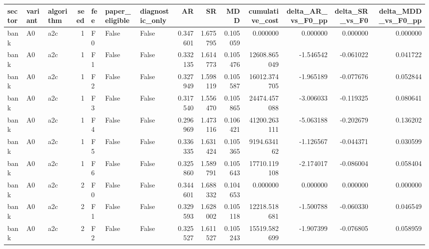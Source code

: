 \begin{tabular}{lllrlllrrrrrrr}
\toprule
    sector & variant & algorithm &  seed & fee &  paper\_eligible &  diagnostic\_only &        AR &        SR &      MDD &  cumulative\_cost &  delta\_AR\_vs\_F0\_pp &  delta\_SR\_vs\_F0 &  delta\_MDD\_vs\_F0\_pp \\
\midrule
      bank &      A0 &       a2c &     1 &  F0 &           False &            False &  0.347601 &  1.675795 & 0.105059 &         0.000000 &           0.000000 &        0.000000 &            0.000000 \\
      bank &      A0 &       a2c &     1 &  F1 &           False &            False &  0.332135 &  1.614773 & 0.105476 &     12608.865049 &          -1.546542 &       -0.061022 &            0.041722 \\
      bank &      A0 &       a2c &     1 &  F2 &           False &            False &  0.327949 &  1.598119 & 0.105587 &     16012.374705 &          -1.965189 &       -0.077676 &            0.052844 \\
      bank &      A0 &       a2c &     1 &  F3 &           False &            False &  0.317540 &  1.556470 & 0.105865 &     24474.457088 &          -3.006033 &       -0.119325 &            0.080641 \\
      bank &      A0 &       a2c &     1 &  F4 &           False &            False &  0.296969 &  1.473116 & 0.106421 &     41200.263111 &          -5.063188 &       -0.202679 &            0.136202 \\
      bank &      A0 &       a2c &     1 &  F5 &           False &            False &  0.336335 &  1.631424 & 0.105365 &      9194.634162 &          -1.126567 &       -0.044371 &            0.030599 \\
      bank &      A0 &       a2c &     1 &  F6 &           False &            False &  0.325860 &  1.589791 & 0.105643 &     17710.119108 &          -2.174017 &       -0.086004 &            0.058404 \\
      bank &      A0 &       a2c &     2 &  F0 &           False &            False &  0.344601 &  1.688332 & 0.104653 &         0.000000 &           0.000000 &        0.000000 &            0.000000 \\
      bank &      A0 &       a2c &     2 &  F1 &           False &            False &  0.329593 &  1.628002 & 0.105118 &     12218.518681 &          -1.500788 &       -0.060330 &            0.046549 \\
      bank &      A0 &       a2c &     2 &  F2 &           False &            False &  0.325527 &  1.611527 & 0.105243 &     15519.582699 &          -1.907399 &       -0.076805 &            0.058959 \\

\end{tabular}
